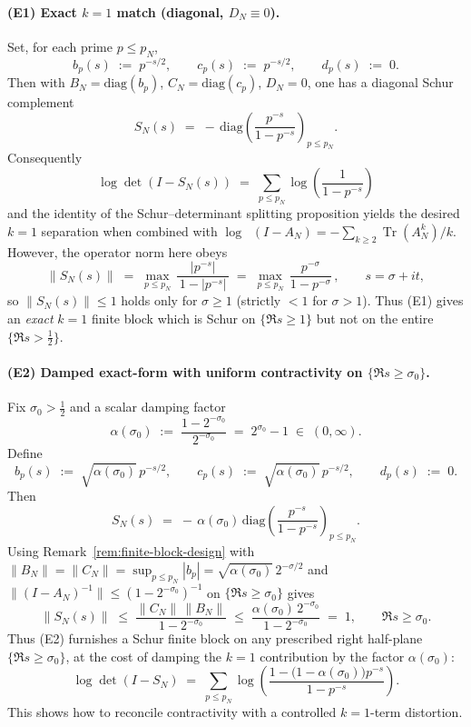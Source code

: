 \documentclass[11pt]{article}
\theoremstyle{definition}
\theoremstyle{remark}
\DeclareMathOperator{\Tr}{Tr}
\DeclareMathOperator{\dettwo}{det_2}
\begin{document}
\paragraph{(E1) Exact $k=1$ match (diagonal, $D_N\equiv 0$).}
Set, for each prime \(p\le p_N\),
\[
 b_p(s)\;:=\;p^{-s/2},\qquad c_p(s)\;:=\;p^{-s/2},\qquad d_p(s)\;:=\;0.
\]
Then with \(B_N=\mathrm{diag}(b_p)\), \(C_N=\mathrm{diag}(c_p)\), \(D_N=0\), one has a diagonal Schur complement
\[
 S_N(s)\;=\; -\,\mathrm{diag}\!\left(\frac{p^{-s}}{1-p^{-s}}\right)_{p\le p_N}.
\]
Consequently
\[
 \log\det(I-S_N(s))\;=\;\sum_{p\le p_N}\log\!\left(\frac{1}{1-p^{-s}}\right)
\]
and the identity of the Schur--determinant splitting proposition yields the desired $k=1$ separation when combined with $\log\dettwo(I-A_N)= -\sum_{k\ge 2}\Tr(A_N^k)/k$. However, the operator norm here obeys
\[
 \|S_N(s)\|\;=\;\max_{p\le p_N}\,\frac{|p^{-s}|}{\,1-|p^{-s}|\,}\;=\;\max_{p\le p_N}\,\frac{p^{-\sigma}}{1-p^{-\sigma}}\,,\qquad s=\sigma+it,
\]
so $\|S_N(s)\|\le 1$ holds only for $\sigma\ge 1$ (strictly $<1$ for $\sigma>1$). Thus (E1) gives an \emph{exact} $k=1$ finite block which is Schur on $\{\Re s\ge 1\}$ but not on the entire $\{\Re s>\tfrac12\}$.

\paragraph{(E2) Damped exact-form with uniform contractivity on $\{\Re s\ge\sigma_0\}$.}
Fix $\sigma_0>\tfrac12$ and a scalar damping factor
\[
 \alpha(\sigma_0)\;:=\;\frac{1-2^{-\sigma_0}}{2^{-\sigma_0}}\;=\;2^{\sigma_0}-1\;\in\;(0,\infty).
\]
Define
\[
 b_p(s)\;:=\;\sqrt{\alpha(\sigma_0)}\,p^{-s/2},\qquad c_p(s)\;:=\;\sqrt{\alpha(\sigma_0)}\,p^{-s/2},\qquad d_p(s)\;:=\;0.
\]
Then
\[
 S_N(s)\;=\;-\,\alpha(\sigma_0)\,\mathrm{diag}\!\left(\frac{p^{-s}}{1-p^{-s}}\right)_{p\le p_N}.
\]
Using Remark~\ref{rem:finite-block-design} with $\|B_N\|=\|C_N\|=\sup_{p\le p_N}|b_p|=\sqrt{\alpha(\sigma_0)}\,2^{-\sigma/2}$ and $\|(I-A_N)^{-1}\|\le (1-2^{-\sigma_0})^{-1}$ on $\{\Re s\ge \sigma_0\}$ gives
\[
 \|S_N(s)\|\;\le\;\frac{\|C_N\|\,\|B_N\|}{1-2^{-\sigma_0}}\;\le\;\frac{\alpha(\sigma_0)\,2^{-\sigma_0}}{1-2^{-\sigma_0}}\;=\;1,\qquad \Re s\ge \sigma_0.
\]
Thus (E2) furnishes a Schur finite block on any prescribed right half-plane $\{\Re s\ge \sigma_0\}$, at the cost of damping the $k=1$ contribution by the factor $\alpha(\sigma_0)$:
\[
 \log\det(I-S_N)\;=\;\sum_{p\le p_N}\log\!\left(\frac{1-\big(1-\alpha(\sigma_0)\big)p^{-s}}{1-p^{-s}}\right).
\]
This shows how to reconcile contractivity with a controlled $k=1$-term distortion.
\end{document}
